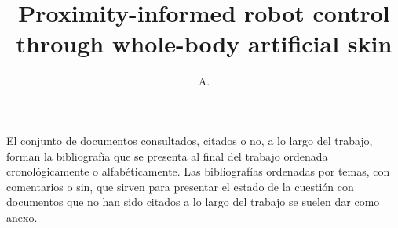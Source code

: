 \documentclass[defaultstyle,11pt]{thesis}
\title{Proximity-informed robot control through whole-body artificial skin}
\author{A.}{Aranburu Fernández}
\begin{document}









\nocite{*}		%

El conjunto de documentos consultados, citados o no, a lo largo del trabajo, forman la bibliografía que se presenta al final del trabajo ordenada cronológicamente o alfabéticamente. Las bibliografías ordenadas por temas, con comentarios o sin, que sirven para presentar el estado de la cuestión con documentos que no han sido citados a lo largo del trabajo se suelen dar como anexo.

\appendix



\end{document}
